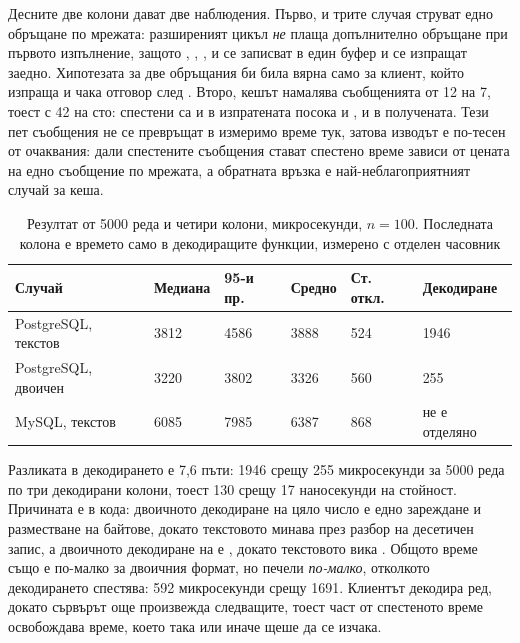 Десните две колони дават две наблюдения. Първо, и трите случая струват едно обръщане по
мрежата: разширеният цикъл \emph{не} плаща допълнително обръщане при първото изпълнение,
защото , , ,  и  се записват в
един буфер и се изпращат заедно. Хипотезата за две обръщания би била вярна само за клиент,
който изпраща  и чака отговор след . Второ, кешът намалява
съобщенията от 12 на 7, тоест с 42 на сто: спестени са  и  в
изпратената посока и ,  и
 в получената. Тези пет съобщения не се превръщат в измеримо време тук,
затова изводът е по-тесен от очаквания: дали спестените съобщения стават спестено време
зависи от цената на едно съобщение по мрежата, а обратната връзка е най-неблагоприятният
случай за кеша.

\begin{table}[H]
\centering
\caption{Резултат от 5000 реда и четири колони, микросекунди, $n=100$. Последната колона е
времето само в декодиращите функции, измерено с отделен часовник}
\label{tab:formats}
\begin{tabular}{L{4.2cm}L{1.9cm}L{1.7cm}L{1.7cm}L{1.7cm}L{2.4cm}}
\toprule
\textbf{Случай} & \textbf{Медиана} & \textbf{95-и пр.} & \textbf{Средно} & \textbf{Ст. откл.} & \textbf{Декодиране} \\
\midrule
PostgreSQL, текстов & 3812 & 4586 & 3888 & 524 & 1946 \\
PostgreSQL, двоичен & 3220 & 3802 & 3326 & 560 & 255 \\
MySQL, текстов      & 6085 & 7985 & 6387 & 868 & не е отделяно \\
\bottomrule
\end{tabular}
\end{table}

Разликата в декодирането е 7,6 пъти: 1946 срещу 255 микросекунди за 5000 реда по три
декодирани колони, тоест 130 срещу 17 наносекунди на стойност. Причината е в кода: двоичното
декодиране на цяло число е едно зареждане и разместване на байтове, докато текстовото минава
през разбор на десетичен запис, а двоичното декодиране на  е
, докато текстовото вика . Общото време също е по-малко за
двоичния формат, но печели \emph{по-малко}, отколкото декодирането спестява: 592 микросекунди
срещу 1691. Клиентът декодира ред, докато сървърът още произвежда следващите, тоест част от
спестеното време освобождава време, което така или иначе щеше да се изчака.

